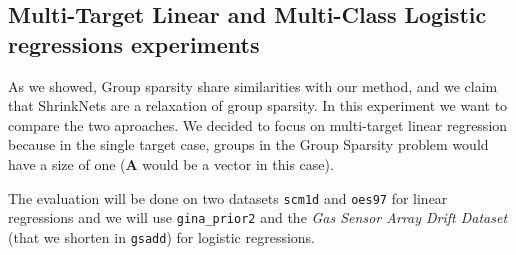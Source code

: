 \subsection{Multi-Target Linear and Multi-Class Logistic regressions experiments}
As we showed, Group sparsity share similarities with our method, and we claim
that ShrinkNets are a relaxation of group sparsity.  In this experiment we want
to compare the two aproaches.  We decided to focus on multi-target linear
regression because in the single target case, groups in the Group Sparsity
problem would have a size of one ($\bm{A}$ would be a vector in this case).

The evaluation will be done on two datasets \texttt{scm1d} and \texttt{oes97}
\cite{Spyromitros-Xioufis2016} for linear regressions and we will use \texttt{gina\_prior2} \cite{4371065} and
the \textit{Gas Sensor Array Drift Dataset} \cite{VERGARA2012320} (that we shorten in
\texttt{gsadd}) for logistic regressions.

